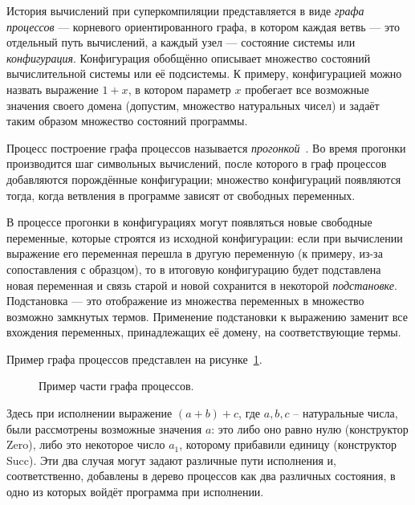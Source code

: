 История вычислений при суперкомпиляции представляется в виде \emph{графа процессов} --- корневого ориентированного графа,
в котором каждая ветвь --- это отдельный путь вычислений, а каждый узел --- состояние системы или \emph{конфигурация}.
Конфигурация обобщённо описывает множество состояний вычислительной системы или её подсистемы.
К примеру, конфигурацией можно назвать выражение $1 + x$, в котором параметр $x$ пробегает
все возможные значения своего домена (допустим, множество натуральных чисел) и задаёт
таким образом множество состояний программы. 

Процесс построение графа процессов называется \emph{прогонкой}~.
Во время прогонки производится шаг символьных вычислений, после которого
в граф процессов добавляются порождённые конфигурации; множество конфигураций
появляются тогда, когда ветвления в программе зависят от свободных переменных.

В процессе прогонки в конфигурациях могут появляться новые свободные переменные,
которые строятся из исходной конфигурации:
если при вычислении выражение его переменная перешла в другую переменную (к примеру, из-за сопоставления с образцом),
то в итоговую конфигурацию будет подставлена новая переменная и связь старой и новой сохранится в
некоторой \emph{подстановке}.
Подстановка --- это отображение из множества переменных в множество возможно замкнутых термов.
Применение подстановки к выражению заменит все вхождения переменных, принадлежащих её домену,
на соответствующие термы. %

Пример графа процессов представлен на рисунке~\ref{fig:pgraphExample}.
\begin{figure}[h!]
\center
{}

\label{fig:pgraphExample}
\caption{Пример части графа процессов.}
\end{figure}
Здесь при исполнении выражение $(a + b) + c$, где $a, b, c$ -- натуральные числа,
были рассмотрены возможные значения $a$: это либо оно равно нулю (конструктор Zero), либо это некоторое
число $a_1$, которому прибавили единицу (конструктор Succ). Эти два случая могут задают
различные пути исполнения и, соответственно, добавлены в дерево процессов как два различных состояния,
в одно из которых войдёт программа при исполнении.



